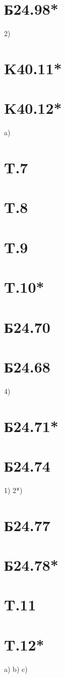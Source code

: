 \documentclass[a4paper,12pt]{article} %
\begin{document}
\section*{Б24.98*}2)
\section*{K40.11*}
\section*{K40.12*}a)
\section*{T.7}
\section*{T.8}
\section*{T.9}
\section*{T.10*}
\section*{Б24.70}
\section*{Б24.68}4)
\section*{Б24.71*}
\section*{Б24.74}
1)
2*)
\section*{Б24.77}
\section*{Б24.78*}
\section*{T.11}
\section*{T.12*}
a)
b)
c)
\end{document}
